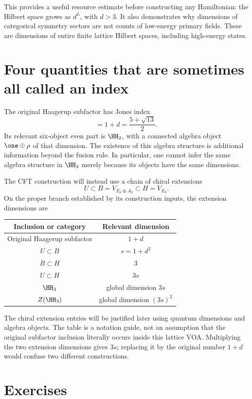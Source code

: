 This provides a useful resource estimate before constructing any
Hamiltonian: the Hilbert space grows as $d^L$, with $d>3$.
It also demonstrates why dimensions of categorical symmetry sectors
are not counts of low-energy primary fields.  These are dimensions
of entire finite lattice Hilbert spaces, including high-energy states.

\section{Four quantities that are sometimes all called an index}

The original Haagerup subfactor has Jones index
\begin{equation}
 [M:N]=1+d=\frac{5+\sqrt{13}}2.
 \label{eq:original-Haagerup-index}
\end{equation}
Its relevant six-object even part is $\HH_2$, with a connected
algebra object $\one\oplus\rho$ of that dimension.  The
existence of this algebra structure is additional information beyond
the fusion rule.  In particular, one cannot infer the same algebra
structure in $\HH_3$ merely because its objects have the same
dimensions.

The CFT construction will instead use a chain of chiral extensions
\[
 U\subset B=V_{E_6\oplus A_2}\subset H=V_{E_8}.
\]
On the proper branch established by its construction inputs, the
extension dimensions are
\begin{center}
\begin{tabular}{c|c}
Inclusion or category & Relevant dimension\\\hline
Original Haagerup subfactor & $1+d$\\
$U\subset B$ & $s=1+d^2$\\
$B\subset H$ & $3$\\
$U\subset H$ & $3s$\\
$\HH_3$ & global dimension $3s$\\
$Z(\HH_3)$ & global dimension $(3s)^2$
\end{tabular}
\end{center}
The chiral extension entries will be justified later using quantum
dimensions and algebra objects.  The table is a notation guide,
not an assumption that the original subfactor inclusion literally
occurs inside this lattice VOA.  Multiplying the two extension
dimensions gives $3s$; replacing it by the original number $1+d$
would confuse two different constructions.

\section{Exercises}

